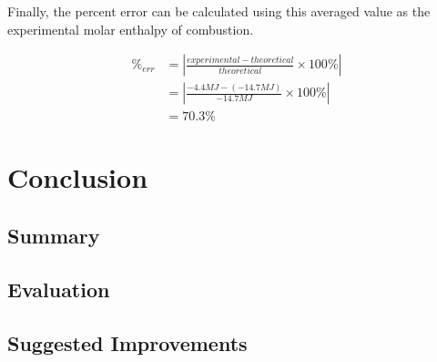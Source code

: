 \documentclass[
	letterpaper, %
	12pt, %
]{CSUniSchoolLabReport}
\begin{document}
Finally, the percent error can be calculated using this averaged value as the experimental molar enthalpy of combustion.

\begin{align*}
  \%_{err} & = \left|\frac{experimental - theoretical}{theoretical} \times 100\%\right|
  \\
           & = \left|\frac{-4.4MJ - (-14.7MJ)}{-14.7MJ} \times 100\%\right|
  \\
           & = 70.3\%
\end{align*}

\section{Conclusion}

\subsection{Summary}

\subsection{Evaluation}

\subsection{Suggested Improvements}


\printbibliography %

\end{document}
